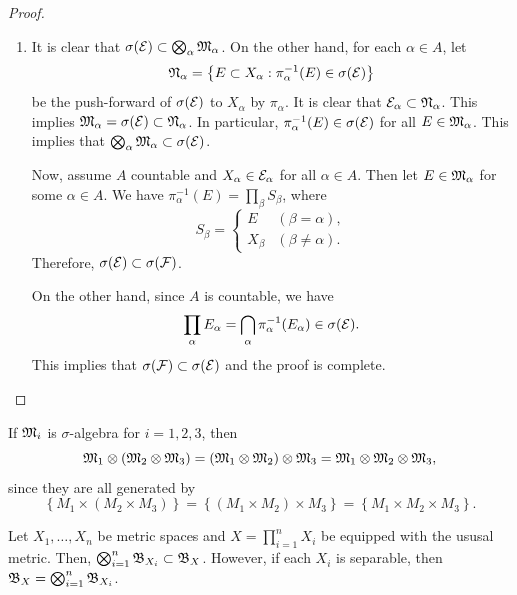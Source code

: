 \documentclass[a4paper]{article}
\begin{document}
{\begin{proof}
\begin{enumerate}
\item It is clear that $\sigma(\mathcal{E}) \subset \bigotimes_\alpha
\mathfrak{M}_\alpha$. On the other hand, for each $\alpha \in A$, let
\[
  \mathfrak{N}_\alpha = \left\{ E \subset X_\alpha : \pi^{-1}_\alpha
  (E) \in \sigma(\mathcal{E}) \right\}
\]
be the push-forward
of $\sigma(\mathcal{E})$ to $X_\alpha$ by $\pi_\alpha$.
It is clear that $\mathcal{E}_\alpha \subset \mathfrak{N}_\alpha$.
This implies $\mathfrak{M}_\alpha = \sigma(\mathcal{E}) \subset \mathfrak{N}_\alpha$.
In particular, $\pi_\alpha^{-1}(E) \in \sigma(\mathcal{E})$
for all $E \in \mathfrak{M}_\alpha$. This implies that
$\bigotimes_\alpha \mathfrak{M}_\alpha \subset \sigma(\mathcal{E})$.

Now, assume $A$ countable and $X_\alpha \in \mathcal{E}_\alpha$
for all $\alpha \in A$. Then let $E \in \mathfrak{M}_\alpha$
for some $\alpha \in A$. We have
$\pi^{-1}_\alpha(E) = \prod_\beta S_\beta$, where
\[
S_\beta = \begin{cases}
  E & (\beta = \alpha), \\
  X_\beta & (\beta \neq \alpha).
\end{cases}
\]
Therefore, $\sigma(\mathcal{E}) \subset \sigma(\mathcal{F})$.

On the other hand, since $A$ is countable, we have
\[
\prod_\alpha E_\alpha = \bigcap_\alpha \pi_\alpha^{-1}
(E_\alpha) \in \sigma(\mathcal{E}).
\]
This implies that $\sigma(\mathcal{F}) \subset \sigma(\mathcal{E})$
and the proof is complete.

\end{enumerate}
\end{proof}
}

\begin{cor}
  If $\mathfrak{M}_i$ is $\sigma$-algebra for $i = 1, 2, 3$, then
  \[
  \mathfrak{M}_1 \otimes (\mathfrak{M}_2 \otimes \mathfrak{M}_3)
  = (\mathfrak{M}_1 \otimes \mathfrak{M}_2) \otimes \mathfrak{M}_3
  = \mathfrak{M}_1 \otimes \mathfrak{M}_2 \otimes \mathfrak{M}_3,
  \]
  since they are all generated by
  \[
  \left\{ M_1 \times (M_2 \times M_3) \right\}
  = \left\{ (M_1 \times M_2) \times M_3 \right\}
  = \left\{ M_1 \times M_2 \times M_3 \right\}.
  \]
\end{cor}

\begin{thm}
  Let $X_1, \dots, X_n$ be metric spaces and
  $X = \prod_{i=1}^n X_i$ be equipped with the ususal
  metric. Then, $\bigotimes_{i=1}^n \mathfrak{B}_{X_i} \subset
  \mathfrak{B}_X$. However, if each $X_i$ is separable,
  then $\mathfrak{B}_X = \bigotimes_{i=1}^n \mathfrak{B}_{X_i}$.
\end{thm}
\end{document}
